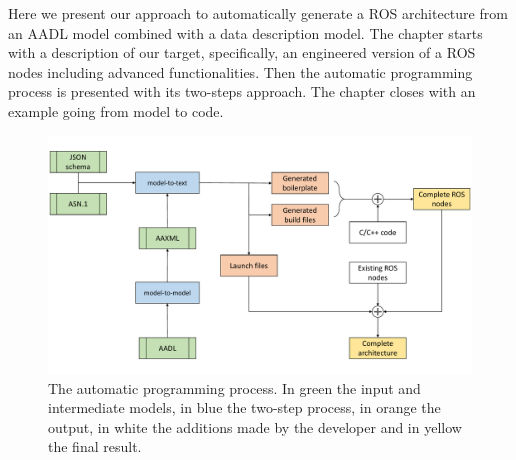Here we present our approach to automatically generate a ROS architecture from an AADL model combined with a data description model. The chapter starts with a description of our target, specifically, an engineered version of a ROS nodes including advanced functionalities. Then the automatic programming process is presented with its two-steps approach. The chapter closes with an example going from model to code.

\minitoc
\newpage

\begin{figure}[t]
    \centering
    \includegraphics[width=\textwidth]{gfx/code-gen-process}
    \caption[The automatic programming process.]{The automatic programming process. In green the input and intermediate models, in blue the two-step process, in orange the output, in white the additions made by the developer and in yellow the final result.}\label{fig:code-gen}
\end{figure}

